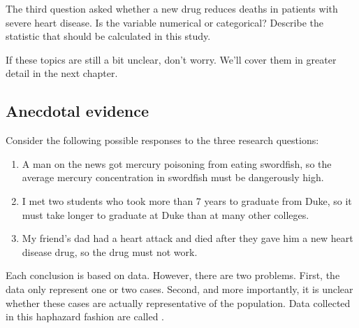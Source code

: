 \begin{exercisewrap}
\begin{nexercise}The third question asked whether a new drug reduces deaths in patients with severe heart disease. Is the variable numerical or categorical? Describe the statistic that should be calculated in this study.\footnotemark
\end{nexercise}
\end{exercisewrap}

If these topics are still a bit unclear, don't worry. We'll cover them in greater detail in the next chapter.


\subsection{Anecdotal evidence}
\label{anecdotalEvidenceSubsection}

Consider the following possible responses to the three research questions:
\begin{enumerate}
\item A man on the news got mercury poisoning from eating swordfish, so the average mercury concentration in swordfish must be dangerously high.
\item\label{iKnowThreeStudentsWhoTookMoreThan7YearsToGraduateAtDuke} I met two students who took more than 7 years to graduate from Duke, so it must take longer to graduate at Duke than at many other colleges.
\item\label{myFriendsDadDiedAfterSulphinpyrazon} My friend's dad had a heart attack and died after they gave him a new heart disease drug, so the drug must not work.
\end{enumerate}
Each conclusion is based on data. However, there are two problems. First, the data only represent one or two cases. Second, and more importantly, it is unclear whether these cases are actually representative of the population. Data collected in this haphazard fashion are called .

